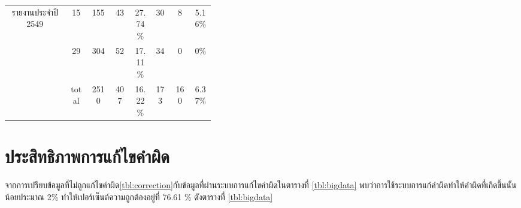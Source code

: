 \begin{table}[H]
\begin{tabular}{|c|c|c|p{0.1\linewidth}|p{0.1\linewidth}|c|p{0.1\linewidth}|p{0.1\linewidth}|}
        \multirow{2}{*}{รายงานประจำปี 2549}   & 15    & 155       & \multicolumn{1}{c|}{43 }         & \multicolumn{1}{c|}{27.74\%} & \multicolumn{1}{c|}{30 }    & \multicolumn{1}{c|}{8   }            & \multicolumn{1}{c|}{5.16\% } \\ \cline{2-8} 
                                            & 29    & 304       & \multicolumn{1}{c|}{52 }         & \multicolumn{1}{c|}{17.11\%} & \multicolumn{1}{c|}{34 }    & \multicolumn{1}{c|}{0   }            & \multicolumn{1}{c|}{0\%    } \\ \hline
                                            & total & 2510      & \multicolumn{1}{c|}{407}         & \multicolumn{1}{c|}{16.22\%} & \multicolumn{1}{c|}{173}    & \multicolumn{1}{c|}{160 }            & \multicolumn{1}{c|}{6.37\% } \\ \hline
        \end{tabular}
        \end{table}

\section{ประสิทธิภาพการแก้ไขคำผิด}
จากการเปรียบข้อมูลที่ไม่ถูกแก้ไขคำผิด\ref{tbl:correction}กับข้อมูลที่ผ่านระบบการแก้ไขคำผิดในตารางที่ \ref{tbl:bigdata} พบว่าการใช้ระบบการแก้คำผิดทำให้คำผิดที่เกิดขึ้นนั้นน้อยประมาณ 2\% ทำให้เปอร์เซ็นต์ความถูกต้องอยู่ที่ 76.61 \% ดังตารางที่ \ref{tbl:bigdata}

